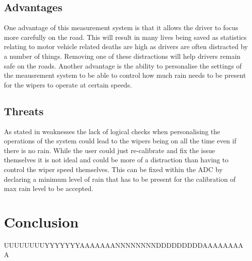\documentclass[conference, 11pt]{IEEEtran}
\begin{document}
\subsection{Advantages}
One advantage of this measurement system is that it allows the driver to focus more carefully on the road. This will result in many lives being saved as statistics relating to motor vehicle related deaths are high as drivers are often distracted by a number of things. Removing one of these distractions will help drivers remain safe on the roads. Another advantage is the ability to personalise the settings of the meausrement system to be able to control how much rain needs to be present for the wipers to operate at certain speeds.

\subsection{Threats}
As stated in weaknesses the lack of logical checks when personalising the operations of the system could lead to the wipers being on all the time even if there is no rain. While the user could just re-calibrate and fix the issue themselves it is not ideal and could be more of a distraction than having to control the wiper speed themselves. This can be fixed within the ADC by declaring a minimum level of rain that has to be present for the calibration of max rain level to be accepted.



\section{Conclusion}
UUUUUUUUYYYYYYYAAAAAAANNNNNNNNDDDDDDDDDAAAAAAAAA
\end{document}
